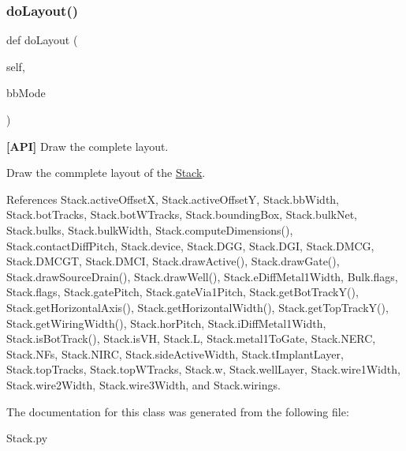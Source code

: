 \mbox{\label{classpython_1_1Stack_1_1Stack_a2b936db85a32775dd3739ccfdfef636d}} 
\subsubsection{\texorpdfstring{do\+Layout()}{doLayout()}}
{\footnotesize\ttfamily def do\+Layout (\begin{DoxyParamCaption}\item[{}]{self,  }\item[{}]{bb\+Mode }\end{DoxyParamCaption})}



{\bfseries \mbox{[}A\+PI\mbox{]}} Draw the complete layout. 

Draw the commplete layout of the \mbox{\hyperlink{classpython_1_1Stack_1_1Stack}{Stack}}. 

References Stack.\+active\+OffsetX, Stack.\+active\+OffsetY, Stack.\+bb\+Width, Stack.\+bot\+Tracks, Stack.\+bot\+W\+Tracks, Stack.\+bounding\+Box, Stack.\+bulk\+Net, Stack.\+bulks, Stack.\+bulk\+Width, Stack.\+compute\+Dimensions(), Stack.\+contact\+Diff\+Pitch, Stack.\+device, Stack.\+D\+GG, Stack.\+D\+GI, Stack.\+D\+M\+CG, Stack.\+D\+M\+C\+GT, Stack.\+D\+M\+CI, Stack.\+draw\+Active(), Stack.\+draw\+Gate(), Stack.\+draw\+Source\+Drain(), Stack.\+draw\+Well(), Stack.\+e\+Diff\+Metal1\+Width, Bulk.\+flags, Stack.\+flags, Stack.\+gate\+Pitch, Stack.\+gate\+Via1\+Pitch, Stack.\+get\+Bot\+Track\+Y(), Stack.\+get\+Horizontal\+Axis(), Stack.\+get\+Horizontal\+Width(), Stack.\+get\+Top\+Track\+Y(), Stack.\+get\+Wiring\+Width(), Stack.\+hor\+Pitch, Stack.\+i\+Diff\+Metal1\+Width, Stack.\+is\+Bot\+Track(), Stack.\+is\+VH, Stack.\+L, Stack.\+metal1\+To\+Gate, Stack.\+N\+E\+RC, Stack.\+N\+Fs, Stack.\+N\+I\+RC, Stack.\+side\+Active\+Width, Stack.\+t\+Implant\+Layer, Stack.\+top\+Tracks, Stack.\+top\+W\+Tracks, Stack.\+w, Stack.\+well\+Layer, Stack.\+wire1\+Width, Stack.\+wire2\+Width, Stack.\+wire3\+Width, and Stack.\+wirings.



The documentation for this class was generated from the following file\+:\begin{DoxyCompactItemize}
\item 
Stack.\+py\end{DoxyCompactItemize}
